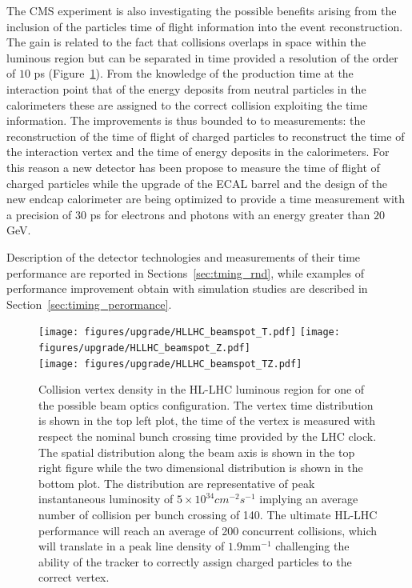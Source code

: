 The CMS experiment is also investigating the possible benefits arising from the inclusion of the particles
time of flight information into the event reconstruction. The gain is related to the fact that
collisions overlaps in space within the luminous region but can be separated in time provided a resolution of the
order of $10$ ps (Figure~\ref{fig:hllhc_beamspot}).
From the knowledge of the production time at the interaction point that of the energy deposits from neutral
particles in the calorimeters these are assigned to the correct collision exploiting the time information.
The improvements is thus bounded to
to measurements: the reconstruction of the time of flight of charged particles to reconstruct the time
of the interaction vertex and the time of energy deposits in the calorimeters. For this reason a new detector
has been propose to measure the time of flight of charged particles while the upgrade of the ECAL barrel and
the design of the new endcap calorimeter are being optimized to provide a time measurement with a precision
of $30$ ps for electrons and photons with an energy greater than $20$ GeV.

Description of the detector technologies and measurements of their time performance are reported in Sections~\ref{sec:tming_rnd},
while examples of performance improvement obtain with simulation studies are described in Section~\ref{sec:timing_perormance}.

\begin{figure}[h!]
  \centering
  \texttt{[image: figures/upgrade/HLLHC\_beamspot\_T.pdf]}
  \texttt{[image: figures/upgrade/HLLHC\_beamspot\_Z.pdf]} \\
  \texttt{[image: figures/upgrade/HLLHC\_beamspot\_TZ.pdf]}
  \caption{Collision vertex density in the HL-LHC luminous region for one of the possible beam optics configuration.
    The vertex time distribution is shown in the top left plot, the time of the vertex is measured with respect
    the nominal bunch crossing time provided by the LHC clock. The spatial distribution along the beam axis is shown in
    the top right figure while the two dimensional distribution is shown in the bottom plot.
    The distribution are representative of peak instantaneous luminosity of $5\times10^{34} cm^{-2}s^{-1}$ implying
    an average number of collision per bunch crossing of 140. The ultimate HL-LHC performance will reach an average of 200
    concurrent collisions, which will translate in a peak line density of $1.9$mm$^{-1}$ challenging the ability
    of the tracker to correctly assign charged particles to the correct vertex.}
  \label{fig:hllhc_beamspot}
\end{figure}

